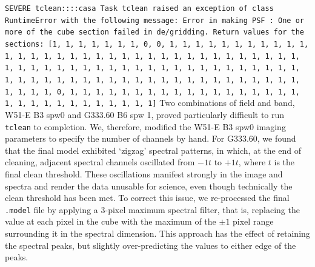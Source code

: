 \documentclass[longauth]{aa} %
\begin{document}
\begin{appendix}
\noindent
\texttt{SEVERE  tclean::::casa  Task tclean raised an exception of class RuntimeError with the following message: Error in making PSF : One or more  of the cube section failed in de/gridding. Return values for the sections: [1, 1, 1, 1, 1, 1, 1, 0, 0, 1, 1, 1, 1, 1, 1, 1, 1, 1, 1, 1, 1, 1, 1, 1, 1, 1, 1, 1, 1, 1, 1, 1, 1, 1, 1, 1, 1, 1, 1, 1, 1, 1, 1, 1, 1, 1, 1, 1, 1, 1, 1, 1, 1, 1, 1, 1, 1, 1, 1, 1, 1, 1, 1, 1, 1, 1, 1, 1, 1, 1, 1, 1, 1, 1, 1, 1, 1, 1, 1, 1, 1, 1, 1, 1, 1, 1, 1, 1, 1, 1, 1, 1, 1, 0, 1, 1, 1, 1, 1, 1, 1, 1, 1, 1, 1, 1, 1, 1, 1, 1, 1, 1, 1, 1, 1, 1, 1, 1, 1, 1, 1, 1, 1, 1]}
\newline
Two combinations of field and band, W51-E B3 spw0 and G333.60 B6 spw 1, proved particularly difficult to run \texttt{tclean} to completion.
We, therefore, modified the W51-E B3 spw0 imaging parameters to specify the number of channels by hand.
For G333.60, we found that the final model exhibited `zigzag' spectral patterns, in which, at the end of cleaning, adjacent spectral channels oscillated from $-1t$ to $+1t$, where $t$ is the final clean threshold.
These oscillations manifest strongly in the image and spectra and render the data unusable for science, even though technically the clean threshold has been met.
To correct this issue, we re-processed the final \texttt{.model} file by applying a 3-pixel maximum spectral filter, that is, replacing the value at each pixel in the cube with the maximum of the $\pm1$ pixel range surrounding it in the spectral dimension.
This approach has the effect of retaining the spectral peaks, but slightly over-predicting the values to either edge of the peaks.


\end{appendix}
\end{document}

